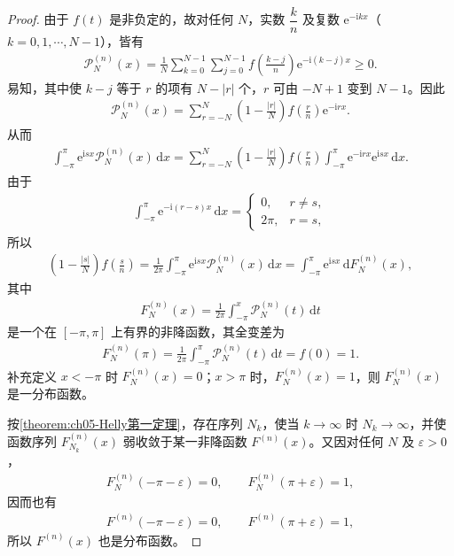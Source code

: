 \documentclass[../../main.tex]{subfiles}
\begin{document}
\begin{proof}
由于 $f(t)$ 是非负定的，故对任何 $N$，实数 $\dfrac{k}{n}$ 及复数 $\mathrm{e}^{-\mathrm{i}kx}$（$k=0,1,\cdots,N-1$），皆有
\begin{align*}
\mathscr{P}_{N}^{(n)}(x)=\frac{1}{N}\sum_{k=0}^{N-1}\sum_{j=0}^{N-1}f\!\left(\frac{k-j}{n}\right)\mathrm{e}^{-\mathrm{i}(k-j)x}\geqslant0.
\end{align*}
易知，其中使 $k-j$ 等于 $r$ 的项有 $N-|r|$ 个，$r$ 可由 $-N+1$ 变到 $N-1$。因此
\begin{align*}
\mathscr{P}_{N}^{(n)}(x)=\sum_{r=-N}^{N}\left(1-\frac{|r|}{N}\right)f\!\left(\frac{r}{n}\right)\mathrm{e}^{-\mathrm{i}rx}.
\end{align*}
从而
\begin{align*}
\int_{-\pi}^{\pi}\mathrm{e}^{\mathrm{i}sx}\mathscr{P}_{N}^{(n)}(x)\,\mathrm{d}x
=\sum_{r=-N}^{N}\left(1-\frac{|r|}{N}\right)f\!\left(\frac{r}{n}\right)\int_{-\pi}^{\pi}\mathrm{e}^{-\mathrm{i}rx}\mathrm{e}^{\mathrm{i}sx}\,\mathrm{d}x.
\end{align*}
由于
\begin{align*}
\int_{-\pi}^{\pi}\mathrm{e}^{-\mathrm{i}(r-s)x}\,\mathrm{d}x=
\begin{cases}
0,&r\neq s,\\
2\pi,&r=s,
\end{cases}
\end{align*}
所以
\begin{align*}
\left(1-\frac{|s|}{N}\right)f\!\left(\frac{s}{n}\right)=\frac{1}{2\pi}\int_{-\pi}^{\pi}\mathrm{e}^{\mathrm{i}sx}\mathscr{P}_{N}^{(n)}(x)\,\mathrm{d}x
=\int_{-\pi}^{\pi}\mathrm{e}^{\mathrm{i}sx}\,\mathrm{d}F_{N}^{(n)}(x),
\end{align*}
其中
\begin{align*}
F_{N}^{(n)}(x)=\frac{1}{2\pi}\int_{-\pi}^{x}\mathscr{P}_{N}^{(n)}(t)\,\mathrm{d}t
\end{align*}
是一个在 $[-\pi,\pi]$ 上有界的非降函数，其全变差为
\begin{align*}
F_{N}^{(n)}(\pi)=\frac{1}{2\pi}\int_{-\pi}^{\pi}\mathscr{P}_{N}^{(n)}(t)\,\mathrm{d}t=f(0)=1.
\end{align*}
补充定义 $x<-\pi$ 时 $F_{N}^{(n)}(x)=0$；$x>\pi$ 时，$F_{N}^{(n)}(x)=1$，则 $F_{N}^{(n)}(x)$ 是一分布函数。

按\cref{theorem:ch05-Helly第一定理}，存在序列 $N_k$，使当 $k\to\infty$ 时 $N_k\to\infty$，并使函数序列 $F_{N_k}^{(n)}(x)$ 弱收敛于某一非降函数 $F^{(n)}(x)$。又因对任何 $N$ 及 $\varepsilon>0$，
\begin{align*}
F_N^{(n)}(-\pi-\varepsilon)=0,\qquad F_N^{(n)}(\pi+\varepsilon)=1,
\end{align*}
因而也有
\begin{align*}
F^{(n)}(-\pi-\varepsilon)=0,\qquad F^{(n)}(\pi+\varepsilon)=1,
\end{align*}
所以 $F^{(n)}(x)$ 也是分布函数。


\end{proof}
\end{document}
